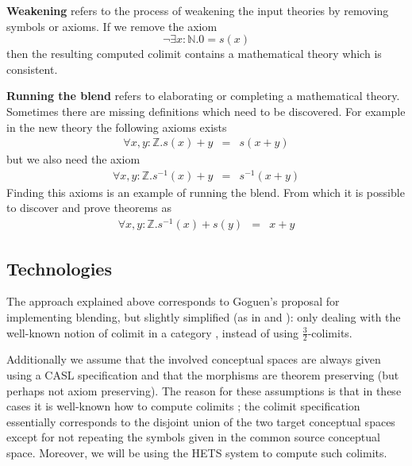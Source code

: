 {\bf Weakening} refers to the process of weakening the input
theories by removing symbols or axioms. If we remove the axiom 
$$
\neg \exists x: \mathbb{N}. 0 = s(x)
$$
then the resulting computed colimit contains a mathematical theory
which is consistent.

{\bf Running the blend} refers to elaborating or completing a
mathematical theory. Sometimes there are missing definitions which
need to be discovered. For example in the new theory the following
axioms exists
\begin{eqnarray*}
\forall x,y:\mathbb{Z}. s(x) + y &=& s(x+y)
\end{eqnarray*}
but we also need the axiom
\begin{eqnarray*}
\forall x,y:\mathbb{Z}. s^{-1}(x) + y &=& s^{-1}(x+y)
\end{eqnarray*}
Finding this axioms is an example of running the blend. From which it
is possible to discover and prove 
theorems as
\begin{eqnarray*}
\forall x,y:\mathbb{Z}. s^{-1}(x) + s(y) &=& x+y
\end{eqnarray*}

\subsection{Technologies}


The approach explained above corresponds to Goguen's
proposal \parencite{Gog99} for implementing blending, but slightly
simplified (as in \textcite{Kutz2012} and \textcite{KuMoNeCo14}): only
dealing with the well-known notion of colimit in a category
\cite{Gog91}, instead of using $\frac{3}{2}$-colimits.


Additionally we assume that the involved conceptual spaces are always
given using a CASL specification \cite{MoHaSaTa08} and that the
morphisms are theorem preserving (but perhaps not axiom
preserving). The reason for these assumptions is that in these cases
it is well-known how to compute colimits \cite{Mo98a}; the colimit
specification essentially corresponds to the disjoint union of the two
target conceptual spaces except for not repeating the symbols given in
the common source conceptual space.  Moreover, we will be using the
HETS system \parencite{MossakowskiEA06} to compute such colimits.


